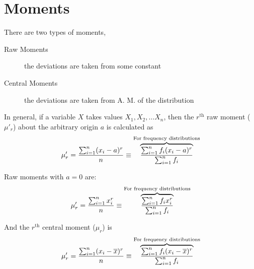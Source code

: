 \documentclass[
10pt, %
a4paper, %
]{report}
\begin{document}
\section{Moments}
There are two types of moments,
\begin{description}
\item[Raw Moments] the deviations are taken from some constant
\item[Central Moments] the deviations are taken from A. M. of the distribution
\end{description}
In general, if a variable \(X\) takes values \(X_1, X_2, \dots X_n\),
then the \(r^\text{th}\) raw moment (\(\mu'_r\)) about the arbitrary origin \(a\) is calculated as
\[\mu'_r = \frac{\sum_{i=1}^{n} (x_i-a)^r}{n} \equiv \overbrace{\frac{\sum_{i=1}^{n} f_i  (x_i-a)^r}{\sum_{i=1}^{n} f_i}}^{\text{For frequency distributions}}\]

Raw moments with \(a=0\) are:
\[\mu'_r = \frac{\sum_{i=1}^{n} x_i^r}{n} \equiv \overbrace{\frac{\sum_{i=1}^{n} f_i  x_i^r}{\sum_{i=1}^{n} f_i}}^{\text{For frequency distributions}}\]

And the \(r^\text{th}\) central moment (\(\mu_r\)) is
\[\mu'_r = \frac{\sum_{i=1}^{n} (x_i-\overline{x})^r}{n} \equiv \overbrace{\frac{\sum_{i=1}^{n} f_i  (x_i-\overline{x})^r}{\sum_{i=1}^{n} f_i}}^{\text{For frequency distributions}}\]
\end{document}
